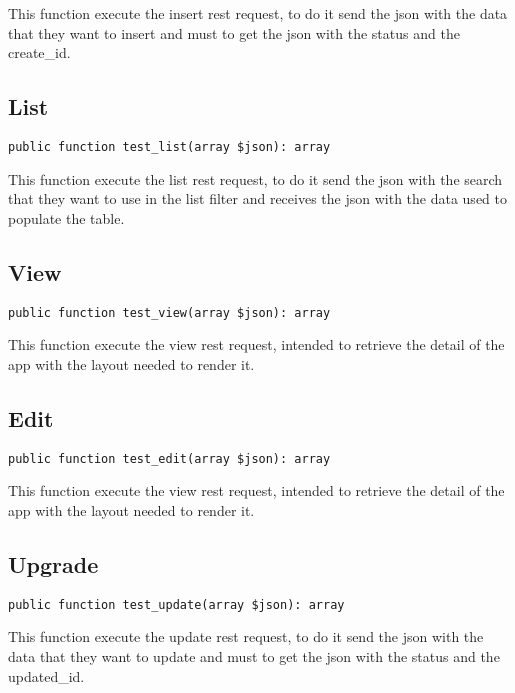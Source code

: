 \documentclass[a4paper]{book}
\begin{document}
This function execute the insert rest request, to do it send the json with
the data that they want to insert and must to get the json with the status
and the create\_id.

\hypertarget{toc26}{}
\subsection{List}

\begin{lstlisting}
public function test_list(array $json): array
\end{lstlisting}

This function execute the list rest request, to do it send the json with
the search that they want to use in the list filter and receives the json
with the data used to populate the table.

\hypertarget{toc27}{}
\subsection{View}

\begin{lstlisting}
public function test_view(array $json): array
\end{lstlisting}

This function execute the view rest request, intended to retrieve the detail
of the app with the layout needed to render it.

\hypertarget{toc28}{}
\subsection{Edit}

\begin{lstlisting}
public function test_edit(array $json): array
\end{lstlisting}

This function execute the view rest request, intended to retrieve the detail
of the app with the layout needed to render it.

\hypertarget{toc29}{}
\subsection{Upgrade}

\begin{lstlisting}
public function test_update(array $json): array
\end{lstlisting}

This function execute the update rest request, to do it send the json with
the data that they want to update and must to get the json with the status
and the updated\_id.
\end{document}
